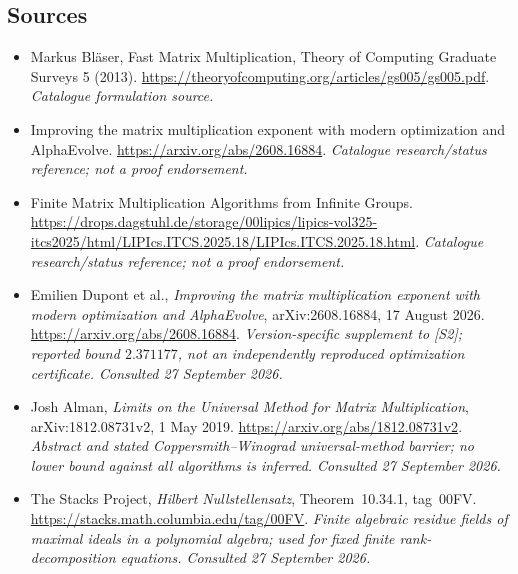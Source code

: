 \documentclass[11pt,a4paper]{article}
\numberwithin{equation}{section}
\begin{document}
\subsection{Sources}
\begin{itemize}\raggedright
\item[\textnormal{[S1]}]\hypertarget{source:3100086:1}{} Markus Bläser, Fast Matrix Multiplication, Theory of Computing Graduate Surveys 5 (2013).
\url{https://theoryofcomputing.org/articles/gs005/gs005.pdf}.
{\small\textit{Catalogue formulation source.}}
\item[\textnormal{[S2]}]\hypertarget{source:3100086:2}{} Improving the matrix multiplication exponent with modern optimization and AlphaEvolve.
\url{https://arxiv.org/abs/2608.16884}.
{\small\textit{Catalogue research/status reference; not a proof endorsement.}}
\item[\textnormal{[S3]}]\hypertarget{source:3100086:3}{} Finite Matrix Multiplication Algorithms from Infinite Groups.
\url{https://drops.dagstuhl.de/storage/00lipics/lipics-vol325-itcs2025/html/LIPIcs.ITCS.2025.18/LIPIcs.ITCS.2025.18.html}.
{\small\textit{Catalogue research/status reference; not a proof endorsement.}}
\item[\textnormal{[E1]}]\hypertarget{extra:3100086:1}{} Emilien Dupont et al.,
\emph{Improving the matrix multiplication exponent with modern optimization
and AlphaEvolve}, arXiv:2608.16884, 17 August 2026.
\url{https://arxiv.org/abs/2608.16884}.
{\small\textit{Version-specific supplement to [S2]; reported bound
$2.371177$, not an independently reproduced optimization certificate.
Consulted 27 September 2026.}}
\item[\textnormal{[E2]}]\hypertarget{extra:3100086:2}{} Josh Alman,
\emph{Limits on the Universal Method for Matrix Multiplication},
arXiv:1812.08731v2, 1 May 2019.
\url{https://arxiv.org/abs/1812.08731v2}.
{\small\textit{Abstract and stated Coppersmith--Winograd universal-method
barrier; no lower bound against all algorithms is inferred.
Consulted 27 September 2026.}}
\item[\textnormal{[E3]}]\hypertarget{extra:3100086:3}{} The Stacks Project,
\emph{Hilbert Nullstellensatz}, Theorem~10.34.1, tag~00FV.
\url{https://stacks.math.columbia.edu/tag/00FV}.
{\small\textit{Finite algebraic residue fields of maximal ideals in a
polynomial algebra; used for fixed finite rank-decomposition equations.
Consulted 27 September 2026.}}

\end{itemize}

\end{document}
